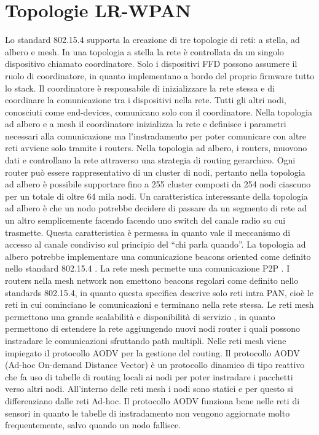 \documentclass[12pt,a4paper,openright,twoside]{report}
\begin{document}
\section{Topologie LR-WPAN}
Lo standard 802.15.4 supporta la creazione di tre topologie di reti: a stella, ad albero e mesh.
In una topologia a stella la rete \`e controllata da un singolo dispositivo chiamato coordinatore. 
Solo i dispositivi FFD possono assumere il ruolo di coordinatore, in quanto implementano a bordo del proprio firmware tutto lo stack. 
Il coordinatore \`e responsabile di inizializzare la rete stessa e di coordinare la comunicazione tra i dispositivi nella rete. Tutti gli altri nodi, conosciuti come end-devices, comunicano solo con il coordinatore.
Nella topologia ad albero e a mesh il coordinatore inizializza la rete e definisce i parametri necessari alla comunicazione ma l'instradamento per poter comunicare con altre reti avviene solo tramite i routers. Nella topologia ad albero, i routers, muovono dati e controllano la rete attraverso una strategia di routing gerarchico. Ogni router pu\`o essere rappresentativo di un cluster di nodi, pertanto nella topologia ad albero \`e possibile supportare fino a 255 cluster composti da 254 nodi ciascuno per un totale di oltre 64 mila nodi. Un caratteristica interessante della topologia ad albero \`e che un nodo potrebbe decidere di passare da un segmento di rete ad un altro semplicemente facendo facendo uno switch del canale radio su cui trasmette. Questa caratteristica \`e permessa in quanto vale il meccanismo di accesso al canale condiviso sul principio del ``chi parla quando''. 
La topologia ad albero potrebbe implementare una comunicazione beacons oriented come definito nello standard 802.15.4 . 
La rete mesh permette una comunicazione P2P . I routers nella mesh network non emettono beacons regolari come definito nello standards 802.15.4, in quanto questa specifica descrive solo reti intra PAN, cio\`e le reti in cui cominciano le comunicazioni e terminano nella rete stessa. Le reti mesh permettono una grande scalabilit\`a e disponibilit\`a di servizio , in quanto permettono di estendere la rete aggiungendo nuovi nodi router i quali possono instradare le comunicazioni sfruttando path multipli. Nelle reti mesh viene impiegato il protocollo AODV per la gestione del routing. Il protocollo AODV (Ad-hoc On-demand Distance Vector) \`e un protocollo dinamico di tipo reattivo che fa uso di tabelle di routing locali ai nodi per poter instradare i pacchetti verso altri nodi. All'interno delle reti mesh i nodi sono statici e per questo si differenziano dalle reti Ad-hoc. Il protocollo AODV funziona bene nelle reti di sensori in quanto le tabelle di instradamento non vengono aggiornate molto frequentemente, salvo quando un nodo fallisce.
\end{document}
